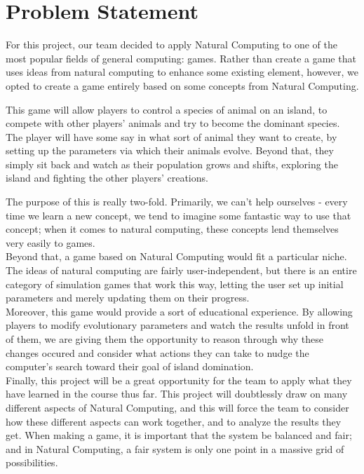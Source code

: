 
\chapter{Problem Statement}

For this project, our team decided to apply Natural Computing to one of the most
popular fields of general computing: games. Rather than create a game that uses
ideas from natural computing to enhance some existing element, however, we opted to
create a game entirely based on some concepts from Natural Computing.

This game will allow players to control a species of animal on an island, to
compete with other players' animals and try to become the dominant species. The
player will have some say in what sort of animal they want to create, by setting
up the parameters via which their animals evolve. Beyond that, they simply sit back
and watch as their population grows and shifts, exploring the island and fighting
the other players' creations.

The purpose of this is really two-fold. Primarily, we can't help ourselves - every
time we learn a new concept, we tend to imagine some fantastic way to use that
concept; when it comes to natural computing, these concepts lend themselves very
easily to games. \\
Beyond that, a game based on Natural Computing would fit a particular niche. The
ideas of natural computing are fairly user-independent, but there is an entire
category of simulation games that work this way, letting the user set up initial
parameters and merely updating them on their progress.\\
Moreover, this game would provide a sort of educational experience. By allowing
players to modify evolutionary parameters and watch the results unfold in front of
them, we are giving them the opportunity to reason through why these changes
occured and consider what actions they can take to nudge the computer's search
toward their goal of island domination.\\
Finally, this project will be a great opportunity for the team to apply what
they have learned in the course thus far. This project will doubtlessly draw on
many different aspects of Natural Computing, and this will force the team to
consider how these different aspects can work together, and to analyze the results
they get. When making a game, it is important that the system be balanced and fair;
and in Natural Computing, a fair system is only one point in a massive grid of
possibilities.
